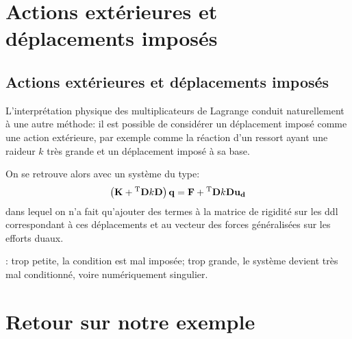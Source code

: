 \medskip
\ifVersionAvecExemplesSepares
   \section{Actions extérieures et déplacements imposés}
\else
   \subsection{Actions extérieures et déplacements imposés}
\fi

L'interprétation physique des multiplicateurs de Lagrange conduit naturellement à une autre méthode:
il est possible de considérer un déplacement imposé comme une action extérieure, par exemple comme
la réaction d'un ressort ayant une raideur $k$ très grande et un déplacement imposé à sa base.

\medskip
On se retrouve alors avec un système du type:
\begin{equation}
\left(\mathbf{K} + {}^\mathrm{T}\mathbf{D}k\mathbf{D}\right) \mathbf{q} = \mathbf{F} + {}^\mathrm{T}\mathbf{D}k\mathbf{D}\mathbf{u_d}
\end{equation}
dans lequel on n'a fait qu'ajouter des termes à la matrice de rigidité sur les ddl correspondant à ces
déplacements et au vecteur des forces généralisées sur les efforts duaux.

\medskip
{}: trop petite, la condition est mal imposée; 
trop grande, le système devient très mal conditionné, voire numériquement singulier.

\medskip
\ifVersionAvecExemplesSepares
   \section{Retour sur notre exemple}
\else
